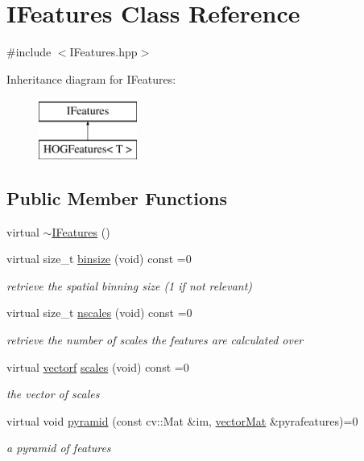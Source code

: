 \hypertarget{classIFeatures}{\section{\-I\-Features \-Class \-Reference}
\label{classIFeatures}
}


{\ttfamily \#include $<$\-I\-Features.\-hpp$>$}

\-Inheritance diagram for \-I\-Features\-:\begin{figure}[H]
\begin{center}
\leavevmode
\includegraphics[height=2.000000cm]{classIFeatures}
\end{center}
\end{figure}
\subsection*{\-Public \-Member \-Functions}
\begin{DoxyCompactItemize}
\item 
virtual \hyperlink{classIFeatures_a7de8c9d6739ebd4504f9d033d71c2f42}{$\sim$\-I\-Features} ()
\item 
virtual size\-\_\-t \hyperlink{classIFeatures_a79f6861190d7c2754d560c6c10baa787}{binsize} (void) const =0
\begin{DoxyCompactList}\small\item\em retrieve the spatial binning size (1 if not relevant) \end{DoxyCompactList}\item 
virtual size\-\_\-t \hyperlink{classIFeatures_abf8d0bf5f66e7b3188ca73b5c9e48a1f}{nscales} (void) const =0
\begin{DoxyCompactList}\small\item\em retrieve the number of scales the features are calculated over \end{DoxyCompactList}\item 
virtual \hyperlink{types_8hpp_a4da5db3ee9e284f719ef5764dbadffc8}{vectorf} \hyperlink{classIFeatures_ad02aea9fd29e438d25e1c7d68c508b9e}{scales} (void) const =0
\begin{DoxyCompactList}\small\item\em the vector of scales \end{DoxyCompactList}\item 
virtual void \hyperlink{classIFeatures_a0cd270503671145fae965c8d9fedc91a}{pyramid} (const cv\-::\-Mat \&im, \hyperlink{types_8hpp_a3207a7addcfa415d1c83622febcb1e9b}{vector\-Mat} \&pyrafeatures)=0
\begin{DoxyCompactList}\small\item\em a pyramid of features \end{DoxyCompactList}\end{DoxyCompactItemize}


